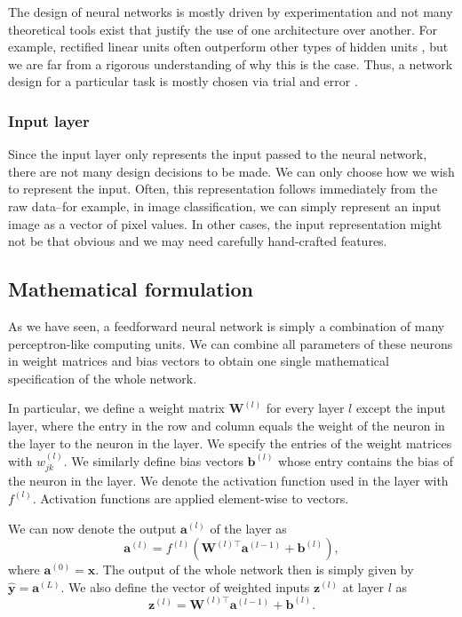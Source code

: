 The design of neural networks is mostly driven by experimentation and not many theoretical tools exist that justify the use of one architecture over another. For example, rectified linear units often outperform other types of hidden units \cite{DBLP:journals/jmlr/GlorotBB11 ,DBLP:conf/nips/KrizhevskySH12}, but we are far from a rigorous understanding of why this is the case. Thus, a network design for a particular task is mostly chosen via trial and error \cite[Ch.\,6,\,pp.\,185-187]{DBLP:books/daglib/0040158}.

\subsubsection{Input layer}
Since the input layer only represents the input passed to the neural network, there are not many design decisions to be made. We can only choose how we wish to represent the input. Often, this representation follows immediately from the raw data--for example, in image classification, we can simply represent an input image as a vector of pixel values. In other cases, the input representation might not be that obvious and we may need carefully hand-crafted features.

\subsection{Mathematical formulation}
As we have seen, a feedforward neural network is simply a combination of many perceptron-like computing units. We can combine all parameters of these neurons in weight matrices and bias vectors to obtain one single mathematical specification of the whole network.

In particular, we define a weight matrix $\bm{W}^{(l)}$ for every layer $l$ except the input layer, where the entry in the  row and  column equals the weight of the  neuron in the  layer to the  neuron in the  layer. We specify the entries of the weight matrices with $w_{jk}^{(l)}$. We similarly define bias vectors $\bm{b}^{(l)}$ whose  entry contains the bias of the  neuron in the  layer. We denote the activation function used in the  layer with $f^{(l)}$. Activation functions are applied element-wise to vectors.

We can now denote the output $\bm{a}^{(l)}$ of the  layer as
\begin{equation}
\bm{a}^{(l)} = f^{(l)}\left(\bm{W}^{(l)\top}\bm{a}^{(l-1)}+\bm{b}^{(l)}\right),
\end{equation}
where $\bm{a}^{(0)} = \bm{x}$. The output of the whole network then is simply given by $\hat{\bm{y}} = \bm{a}^{(L)}$. We also define the vector of weighted inputs $\bm{z}^{(l)}$ at layer $l$ as
\begin{equation}
\bm{z}^{(l)} = \bm{W}^{(l)\top}\bm{a}^{(l-1)}+\bm{b}^{(l)}.
\end{equation}

